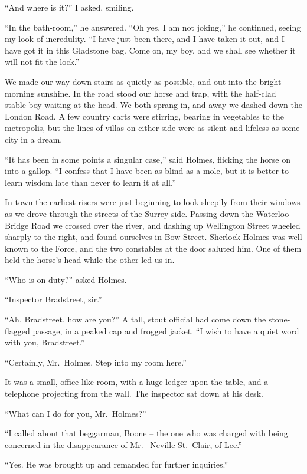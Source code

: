 “And where is it?” I asked, smiling.

“In the bath-room,” he answered. “Oh yes, I am not joking,”
he continued, seeing my look of incredulity. “I have
just been there, and I have taken it out, and I have got it
in this Gladstone bag. Come on, my boy, and we shall see
whether it will not fit the lock.”

We made our way down-stairs as quietly as possible, and
out into the bright morning sunshine. In the road stood our
horse and trap, with the half-clad stable-boy waiting at the
head. We both sprang in, and away we dashed down the
London Road. A few country carts were stirring, bearing in
vegetables to the metropolis, but the lines of villas on either
side were as silent and lifeless as some city in a dream.

“It has been in some points a singular case,” said Holmes,
flicking the horse on into a gallop. “I confess that I have
been as blind as a mole, but it is better to learn wisdom late
than never to learn it at all.”

In town the earliest risers were just beginning to look sleepily
from their windows as we drove through the streets of the
Surrey side. Passing down the Waterloo Bridge Road we
crossed over the river, and dashing up Wellington Street
wheeled sharply to the right, and found ourselves in Bow
Street. Sherlock Holmes was well known to the Force, and
the two constables at the door saluted him. One of them
held the horse’s head while the other led us in.

“Who is on duty?” asked Holmes.

“Inspector Bradstreet, sir.”

“Ah, Bradstreet, how are you?” A tall, stout official had
come down the stone-flagged passage, in a peaked cap and
frogged jacket. “I wish to have a quiet word with you,
Bradstreet.”

“Certainly, Mr.~Holmes. Step into my room here.”

It was a small, office-like room, with a huge ledger upon the
table, and a telephone projecting from the wall. The inspector
sat down at his desk.

“What can I do for you, Mr.~Holmes?”

“I called about that beggarman, Boone -- the one who was
charged with being concerned in the disappearance of Mr.\ %
Neville St.~Clair, of Lee.”

“Yes. He was brought up and remanded for further
inquiries.”

